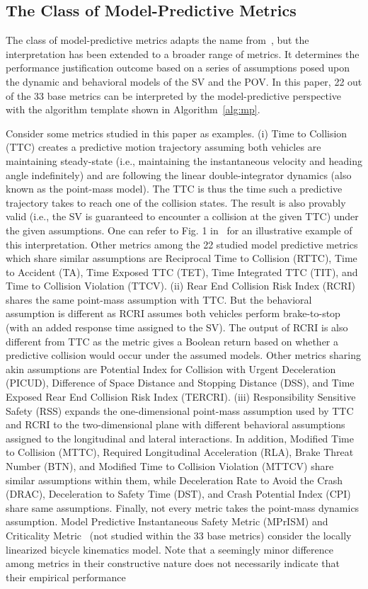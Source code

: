 \documentclass[journal]{IEEEtran}
\begin{document}
\subsection{The Class of Model-Predictive Metrics}

The class of model-predictive metrics adapts the name from~\cite{weng2021class}, but the interpretation has been extended to a broader range of metrics. It determines the performance justification outcome based on a series of assumptions posed upon the dynamic and behavioral models of the SV and the POV. In this paper, 22 out of the 33 base metrics can be interpreted by the model-predictive perspective with the algorithm template shown in Algorithm~\ref{alg:mp}.

Consider some metrics studied in this paper as examples. (i) Time to Collision (TTC) creates a predictive motion trajectory assuming both vehicles are maintaining steady-state (i.e., maintaining the instantaneous velocity and heading angle indefinitely) and are following the linear double-integrator dynamics (also known as the point-mass model). The TTC is thus the time such a predictive trajectory takes to reach one of the collision states. The result is also provably valid (i.e., the SV is guaranteed to encounter a collision at the given TTC) under the given assumptions. One can refer to Fig. 1 in~\cite{weng2021class} for an illustrative example of this interpretation. Other metrics among the 22 studied model predictive metrics which share similar assumptions are Reciprocal Time to Collision (RTTC), Time to Accident (TA), Time Exposed TTC (TET), Time Integrated TTC (TIT), and Time to Collision Violation (TTCV). (ii) Rear End Collision Risk Index (RCRI) shares the same point-mass assumption with TTC. But the behavioral assumption is different as RCRI assumes both vehicles perform brake-to-stop (with an added response time assigned to the SV). The output of RCRI is also different from TTC as the metric gives a Boolean return based on whether a predictive collision would occur under the assumed models. Other metrics sharing akin assumptions are Potential Index for Collision with Urgent Deceleration (PICUD), Difference of Space Distance and Stopping Distance (DSS), and Time Exposed Rear End Collision Risk Index (TERCRI). (iii) Responsibility Sensitive Safety (RSS) expands the one-dimensional point-mass assumption used by TTC and RCRI to the two-dimensional plane with different behavioral assumptions assigned to the longitudinal and lateral interactions. In addition, Modified Time to Collision (MTTC), Required Longitudinal Acceleration (RLA), Brake Threat Number (BTN), and Modified Time to Collision Violation (MTTCV) share similar assumptions within them, while Deceleration Rate to Avoid the Crash (DRAC), Deceleration to Safety Time (DST), and Crash Potential Index (CPI) share same assumptions. Finally, not every metric takes the point-mass dynamics assumption. Model Predictive Instantaneous Safety Metric (MPrISM) and Criticality Metric~\cite{junietz2018criticality} (not studied within the 33 base metrics) consider the locally linearized bicycle kinematics model. Note that a seemingly minor difference among metrics in their constructive nature does not necessarily indicate that their empirical performance 
\end{document}
